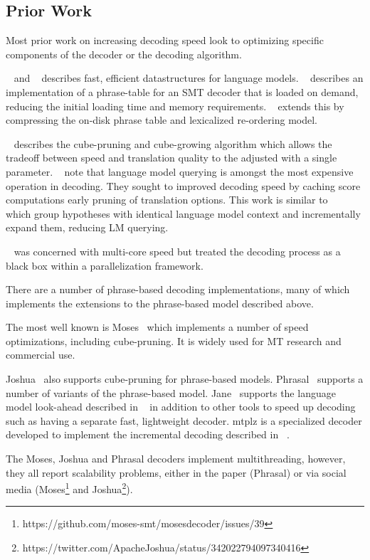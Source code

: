 \documentclass[]{article}
\begin{document}
\subsection{Prior Work}

Most prior work on increasing decoding speed look to optimizing specific components of the decoder or the decoding algorithm. 

~\cite{Heafield-kenlm} and ~\cite{yasuhara-EtAl:2013:EMNLP} describes fast, efficient datastructures for language models. ~\cite{zens2007efficient} describes an implementation of a phrase-table for an SMT decoder that is loaded on demand, reducing the initial loading time and memory requirements. ~\cite{junczys_tsd_2012b} extends this by compressing the on-disk phrase table and lexicalized re-ordering model. 

~\cite{Chiang:2007:cl} describes the cube-pruning and cube-growing algorithm which allows the tradeoff between speed and translation quality to the adjusted with a single parameter. ~\cite{wuebker2012fast} note that language model querying is amongst the most expensive operation in decoding. They sought to improved decoding speed by caching score computations early pruning of translation options. This work is similar to ~\cite{Heafield-mtplz} which group hypotheses with identical language model context and incrementally expand them, reducing LM querying.

~\cite{mfernandez2016boosting} was concerned with multi-core speed but treated the decoding process as a black box within a parallelization framework.

There are a number of phrase-based decoding implementations, many of which implements the extensions to the phrase-based model described above.

The most well known is Moses~\citep{koehn-EtAl:2007:PosterDemo} which implements a number of speed optimizations, including cube-pruning. It is widely used for MT research and commercial use. 

Joshua~\citep{Joshua-Decoder} also supports cube-pruning for phrase-based models. Phrasal~\citep{spence2014phrasal} supports a number of variants of the phrase-based model. Jane~\citep{peitz2012jane} supports the language model look-ahead described in ~\cite{wuebker2012fast} in addition to other tools to speed up decoding such as having a separate fast, lightweight decoder. mtplz is a specialized decoder developed to implement the incremental decoding described in ~\cite{Heafield-mtplz}.

The Moses, Joshua and Phrasal decoders implement multithreading, however, they all report scalability problems, either in the paper (Phrasal) or via social media (Moses\footnote{\scriptsize https://github.com/moses-smt/mosesdecoder/issues/39} and Joshua\footnote{\scriptsize https://twitter.com/ApacheJoshua/status/342022794097340416}).
\end{document}
